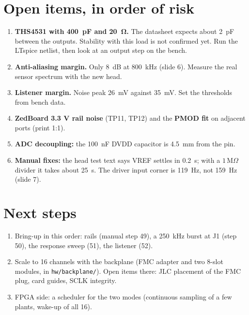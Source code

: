 \documentclass[11pt,a4paper]{article}
\begin{document}
\section{Open items, in order of risk}
\begin{enumerate}[leftmargin=1.4em]
\item \textbf{THS4531 with \SI{400}{pF} and \SI{20}{\ohm}.} The datasheet expects about \SI{2}{pF} between the outputs. Stability with this load is not confirmed yet. Run the LTspice netlist, then look at an output step on the bench.
\item \textbf{Anti-aliasing margin.} Only \SI{8}{dB} at \SI{800}{kHz} (slide 6). Measure the real sensor spectrum with the new head.
\item \textbf{Listener margin.} Noise peak \SI{26}{mV} against \SI{35}{mV}. Set the thresholds from bench data.
\item \textbf{ZedBoard 3.3 V rail noise} (TP11, TP12) and the \textbf{PMOD fit} on adjacent ports (print 1:1).
\item \textbf{ADC decoupling:} the \SI{100}{nF} DVDD capacitor is \SI{4.5}{mm} from the pin.
\item \textbf{Manual fixes:} the head test text says VREF settles in \SI{0.2}{s}; with a $1\,$M$\Omega$ divider it takes about \SI{25}{s}. The driver input corner is \SI{119}{Hz}, not \SI{159}{Hz} (slide 7).
\end{enumerate}

\section{Next steps}
\begin{enumerate}[leftmargin=1.4em]
\item Bring-up in this order: rails (manual step 49), a \SI{250}{kHz} burst at J1 (step 50), the response sweep (51), the listener (52).
\item Scale to 16 channels with the backplane (FMC adapter and two 8-slot modules, in \texttt{hw/backplane/}). Open items there: JLC placement of the FMC plug, card guides, SCLK integrity.
\item FPGA side: a scheduler for the two modes (continuous sampling of a few plants, wake-up of all 16).
\end{enumerate}
\end{document}
